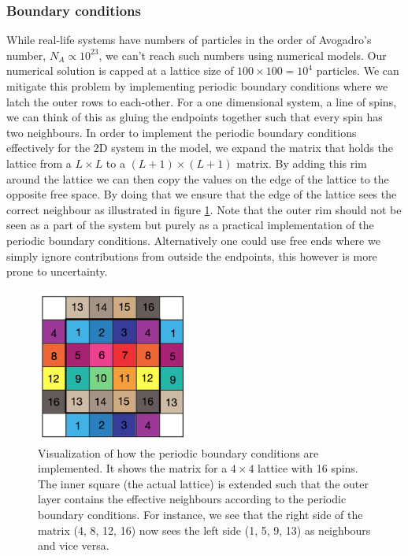 \documentclass[%
 reprint,
nofootinbib,
aps,
]{revtex4-1}
\begin{document}
\subsubsection{Boundary conditions}
While real-life systems have numbers of particles in the order of Avogadro's number, $N_A \propto 10^{23}$, we can't reach such numbers using numerical models. Our numerical solution is capped at a lattice size of $100 \times 100 = 10^4$ particles. We can mitigate this problem by implementing periodic boundary conditions where we latch the outer rows to each-other. For a one dimensional system, a line of spins, we can think of this as gluing the endpoints together such that every spin has two neighbours. In order to implement the periodic boundary conditions effectively for the 2D system in the model, we expand the matrix that holds the lattice from a $L\times L$ to a $(L+1) \times (L+1)$ matrix. By adding this rim around the lattice we can then copy the values on the edge of the lattice to the opposite free space. By doing that we ensure that the edge of the lattice sees the correct neighbour as illustrated in figure \ref{fig:periodic_boundary}. Note that the outer rim should not be seen as a part of the system but purely as a practical implementation of the periodic boundary conditions. Alternatively one could use free ends where we simply ignore contributions from outside the endpoints, this however is more prone to uncertainty. 
 \begin{figure}  
    \centering
    \includegraphics[width=0.45\textwidth]{figures/periodic_boundary.png}
    \caption{Visualization of how the periodic boundary conditions are implemented. It shows the matrix for a $4\times4$ lattice with 16 spins. The inner square (the actual lattice) is extended such that the outer layer contains the effective neighbours according to the periodic boundary conditions. For instance, we see that the right side of the matrix (4, 8, 12, 16) now sees the left side (1, 5, 9, 13) as neighbours and vice versa.}
    \label{fig:periodic_boundary}
\end{figure}
\end{document}

